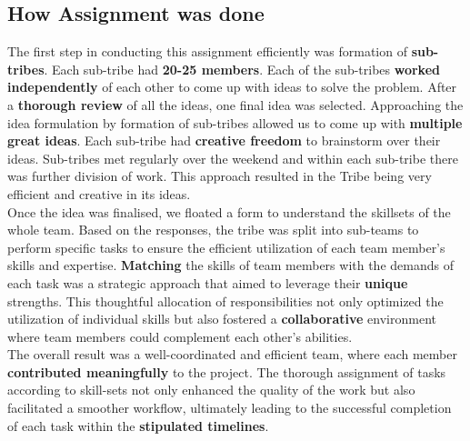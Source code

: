 \newpage
\subsection{How Assignment was done}


The first step in conducting this assignment efficiently was formation of \textbf{sub-tribes}. Each sub-tribe had \textbf{20-25 members}. Each of the sub-tribes \textbf{worked independently} of each other to come up with ideas to solve the problem. After a \textbf{thorough review} of all the ideas, one final idea was selected. Approaching the idea formulation by formation of sub-tribes allowed us to come up with \textbf{multiple great ideas}. Each sub-tribe had \textbf{creative freedom} to brainstorm over their ideas. Sub-tribes met regularly over the weekend and within each sub-tribe there was further division of work. This approach resulted in the Tribe being very efficient and creative in its ideas.
\\

Once the idea was finalised, we floated a form to understand the skillsets of the whole team. Based on the responses, the tribe was split into sub-teams to perform specific tasks to ensure the efficient utilization of each team member's skills and expertise. \textbf{Matching} the skills of team members with the demands of each task was a strategic approach that aimed to leverage their \textbf{unique} strengths. This thoughtful allocation of responsibilities not only optimized the utilization of individual skills but also fostered a \textbf{collaborative} environment where team members could complement each other's abilities.
\\

The overall result was a well-coordinated and efficient team, where each member \textbf{contributed meaningfully} to the project. The thorough assignment of tasks according to skill-sets not only enhanced the quality of the work but also facilitated a smoother workflow, ultimately leading to the successful completion of each task within the \textbf{stipulated timelines}.
\\

